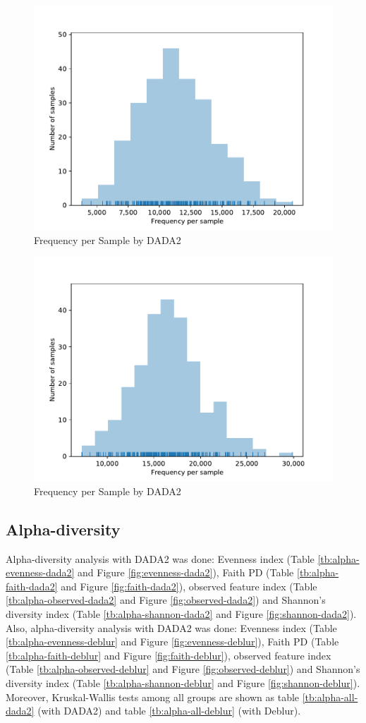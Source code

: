 \documentclass[a4paper]{article}
\begin{document}
            \begin{figure}[p]
                \centering
                \includegraphics[width=0.6 \linewidth]{figures/Rarefaction/DADA.pdf}
                \caption{Frequency per Sample by DADA2}
                \label{fig:frequency-sample-dada2}
            \end{figure}

            \begin{figure}[p]
                \centering
                \includegraphics[width=0.6 \linewidth]{figures/Rarefaction/Deblur.pdf}
                \caption{Frequency per Sample by DADA2}
                \label{fig:frequency-sample-deblur}
            \end{figure}

        \subsection{Alpha-diversity}
            Alpha-diversity analysis with DADA2 was done: Evenness index (Table \ref{tb:alpha-evenness-dada2} and Figure \ref{fig:evenness-dada2}), Faith PD (Table \ref{tb:alpha-faith-dada2} and Figure \ref{fig:faith-dada2}), observed feature index (Table \ref{tb:alpha-observed-dada2} and Figure \ref{fig:observed-dada2}) and Shannon's diversity index (Table \ref{tb:alpha-shannon-dada2} and Figure \ref{fig:shannon-dada2}). Also, alpha-diversity analysis with DADA2 was done: Evenness index (Table \ref{tb:alpha-evenness-deblur} and Figure \ref{fig:evenness-deblur}), Faith PD (Table \ref{tb:alpha-faith-deblur} and Figure \ref{fig:faith-deblur}), observed feature index (Table \ref{tb:alpha-observed-deblur} and Figure \ref{fig:observed-deblur}) and Shannon's diversity index (Table \ref{tb:alpha-shannon-deblur} and Figure \ref{fig:shannon-deblur}). Moreover, Kruskal-Wallis tests among all groups are shown as table \ref{tb:alpha-all-dada2} (with DADA2) and table \ref{tb:alpha-all-deblur} (with Deblur).
\end{document}
